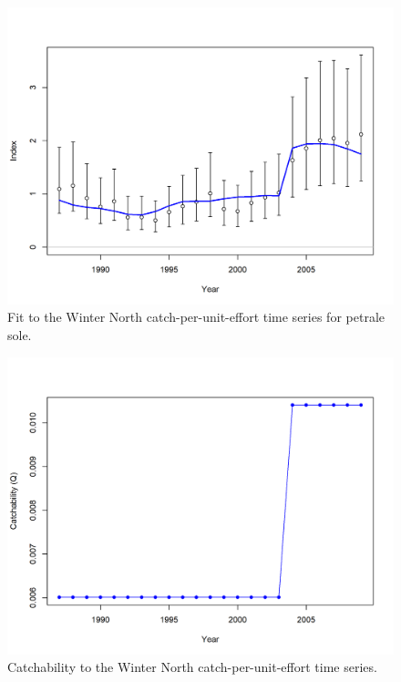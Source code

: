 \documentclass[12pt,]{article}
\begin{document}
\FloatBarrier

\begin{figure}
\centering
\includegraphics{r4ss/plots_mod1/index2_cpuefit_Winter (N).png}
\caption{Fit to the Winter North catch-per-unit-effort time series for
petrale sole. \label{fig:fit_wn_cpue}}
\end{figure}

\FloatBarrier

\begin{figure}
\centering
\includegraphics{r4ss/plots_mod1/index7_timevaryingQ_Winter (N).png}
\caption{Catchability to the Winter North catch-per-unit-effort time
series. \label{fig:q_north}}
\end{figure}
\end{document}
